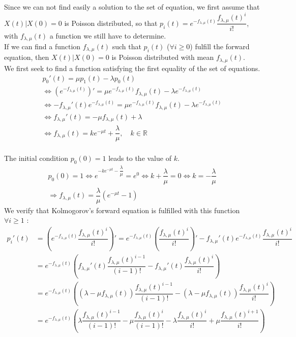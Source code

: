 \documentclass{article}
\begin{document}
Since we can not find easily a solution to the set of equation, we first assume that $X(t)|X(0)=0$ is Poisson distributed, so that $p_i(t)=e^{-f_{\lambda,\mu}(t)}\dfrac{f_{\lambda,\mu}(t)^i}{i!}$, with $f_{\lambda,\mu}(t)$ a function we still have to determine.\\

If we can find a function $f_{\lambda,\mu}(t)$ such that $p_i(t)$ ($\forall i \geq 0$) fulfill the forward equation, then $X(t)|X(0)=0$ is Poisson distributed with mean $f_{\lambda,\mu}(t)$.\\

We first seek to find a function satisfying the first equality of the set of equations. \\
\begin{gather*} p_0'(t)=\mu p_1(t)- \lambda p_0(t) \\
\iff \left(e^{-f_{\lambda,\mu}(t)}\right)'=\mu e^{-f_{\lambda,\mu}(t)}f_{\lambda,\mu}(t)-\lambda e^{-f_{\lambda,\mu}(t)}\\
\iff  -f_{\lambda,\mu}'(t)e^{-f_{\lambda,\mu}(t)}=\mu e^{-f_{\lambda,\mu}(t)}f_{\lambda,\mu}(t)-\lambda e^{-f_{\lambda,\mu}(t)}\\
\iff f_{\lambda,\mu}'(t)=-\mu f_{\lambda,\mu}(t)+\lambda \\
\iff f_{\lambda,\mu}(t)=ke^{-\mu t} +\dfrac{\lambda}{\mu}, \quad k\in \mathbb{R} \\
\end{gather*}

The initial condition $p_0(0)=1$ leads to the value of $k$.
\begin{gather*} 
p_0(0)=1 \iff e^{- ke^{-\mu t} -\dfrac{\lambda}{\mu}}=e^0 \iff  k+\dfrac{\lambda}{\mu}=0 \iff k=-\dfrac{\lambda}{\mu}\\
\Rightarrow f_{\lambda,\mu}(t)=\dfrac{\lambda}{\mu}(e^{-\mu t}-1)
\end{gather*}
We verify that Kolmogorov's forward equation is fulfilled with this function $\forall i\geq 1$ :
\begin{align*}
p_i'(t) &=  \left(e^{-f_{\lambda,\mu}(t)}\dfrac{f_{\lambda,\mu}(t)^i}{i!}\right)' = e^{-f_{\lambda,\mu}(t)}\left(\dfrac{f_{\lambda,\mu}(t)^i}{i!}\right)'-f_{\lambda,\mu}'(t)e^{-f_{\lambda,\mu}(t)}\dfrac{f_{\lambda,\mu}(t)^i}{i!} \\
&= e^{-f_{\lambda,\mu}(t)} \left( f_{\lambda,\mu}'(t)\dfrac{f_{\lambda,\mu}(t)^{i-1}}{(i-1)!}- f_{\lambda,\mu}'(t)\dfrac{f_{\lambda,\mu}(t)^i}{i!} \right) \\
&= e^{-f_{\lambda,\mu}(t)} \left( (\lambda-\mu f_{\lambda,\mu}(t)) \dfrac{f_{\lambda,\mu}(t)^{i-1}}{(i-1)!}- (\lambda-\mu f_{\lambda,\mu}(t)) \dfrac{f_{\lambda,\mu}(t)^i}{i!} \right) \\
&= e^{-f_{\lambda,\mu}(t)} \left( \lambda\dfrac{f_{\lambda,\mu}(t)^{i-1}}{(i-1)!}-\mu \dfrac{f_{\lambda,\mu}(t)^{i}}{(i-1)!}-\lambda\dfrac{f_{\lambda,\mu}(t)^{i}}{i!}+\mu \dfrac{f_{\lambda,\mu}(t)^{i+1}}{i!} \right)
\end{align*}
\end{document}
